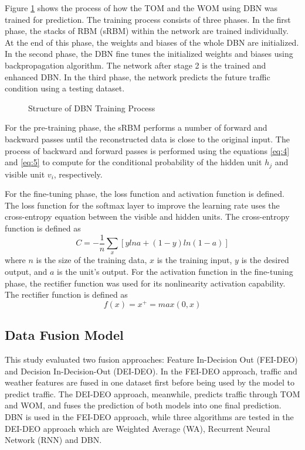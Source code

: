 Figure \ref{fig:dbntraining} shows the process of how the TOM and the WOM using DBN was trained for prediction. The training process consists of three phases. In the first phase, the stacks of RBM (sRBM) within the network are trained individually. At the end of this phase, the weights and biases of the whole DBN are initialized. In the second phase, the DBN fine tunes the initialized weights and biases using backpropagation algorithm. The network after stage 2 is the trained and enhanced DBN. In the third phase, the network predicts the future traffic condition using a testing dataset.

\begin{figure}[h]
	\centering
	\captionsetup{justification=centering}
	\caption{Structure of DBN Training Process}
	\label{fig:dbntraining}
\end{figure}

For the pre-training phase, the sRBM performs a number of forward and backward passes until the reconstructed data is close to the original input. The process of backward and forward passes is performed using the equations \ref{eq:4} and \ref{eq:5} to compute for the conditional probability of the hidden unit $h_j$ and visible unit $v_i$, respectively.

For the fine-tuning phase, the loss function and activation function is defined.
The loss function for the softmax layer to improve the learning rate uses the cross-entropy equation between the visible and hidden units. The cross-entropy function is defined as
\begin{equation}
C = -\frac{1}{n}\sum_x [y ln a + (1 - y) ln (1-a)]
\end{equation}
\noindent where $n$ is the size of the training data, $x$ is the training input, $y$ is the desired output, and $a$ is the unit’s output.
For the activation function in the fine-tuning phase, the rectifier function was used for its nonlinearity activation capability. The rectifier function is defined as
\begin{equation}
f(x) = x^+ = max(0, x)
\end{equation}


\subsection{Data Fusion Model}
This study evaluated two fusion approaches: Feature In-Decision Out (FEI-DEO) and Decision In-Decision-Out (DEI-DEO). In the FEI-DEO approach, traffic and weather features are fused in one dataset first before being used by the model to predict traffic. The DEI-DEO approach, meanwhile, predicts traffic through TOM and WOM, and fuses the prediction of both models into one final prediction. DBN is used in the FEI-DEO approach, while three algorithms are tested in the DEI-DEO approach which are Weighted Average (WA), Recurrent Neural Network (RNN) and DBN.


